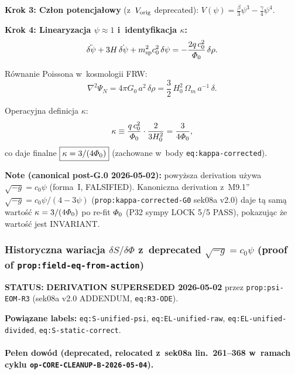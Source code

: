 \textbf{Krok 3: Cz\l{}on potencja\l{}owy} (z~$V_{\rm orig}$ deprecated):
$V(\psi) = \frac{\beta}{3}\psi^3 - \frac{\gamma}{4}\psi^4$.

\textbf{Krok 4: Linearyzacja $\psi \approx 1$ i~identyfikacja $\kappa$:}
\begin{equation}\label{eq:cosmo-linearized-unified}
  \ddot{\delta\psi} + 3H\,\dot{\delta\psi}
  + m_{\mathrm{sp}}^2 c_0^2\,\delta\psi
  = -\frac{2q\,c_0^2}{\varPhi_0}\,\delta\rho.
\end{equation}

R\'ownanie Poissona w~kosmologii FRW:
\begin{equation}\label{eq:poisson-frw}
  \nabla^2\Psi_N = 4\pi G_0\,a^2\,\delta\rho
  = \frac{3}{2}\,H_0^2\,\Omega_m\,a^{-1}\,\delta.
\end{equation}

Operacyjna definicja $\kappa$:
\begin{equation}\label{eq:kappa-def-operational}
  \kappa \equiv \frac{q\,c_0^2}{\varPhi_0}
  \cdot\frac{2}{3H_0^2}
  = \frac{3}{4\varPhi_0},
\end{equation}
co daje finalne $\boxed{\kappa = 3/(4\varPhi_0)}$
(zachowane w~body \texttt{eq:kappa-corrected}).

\textbf{Note (canonical post-G.0 2026-05-02):} powy\.zsza derivation
u\.zywa $\sqrt{-g} = c_0\psi$ (forma~I, FALSIFIED). Kanoniczna derivation
z~M9.1'' $\sqrt{-g} = c_0\psi/(4-3\psi)$ (\texttt{prop:kappa-corrected-G0}
sek08a v2.0) daje t\k{a} sam\k{a} warto\'s\'c $\kappa = 3/(4\varPhi_0)$
po re-fit $\varPhi_0$ (P32 sympy LOCK 5/5 PASS), pokazuj\k{a}c \.ze
warto\'s\'c jest INVARIANT.

\subsubsection{Historyczna wariacja $\delta S/\delta\Phi$ z~deprecated
$\sqrt{-g}=c_0\psi$ (proof of \texttt{prop:field-eq-from-action})}%
\label{app:field-eq-deprecated-proof}

\textbf{STATUS:} \textbf{DERIVATION SUPERSEDED 2026-05-02} przez
\texttt{prop:psi-EOM-R3} (sek08a v2.0 ADDENDUM, \texttt{eq:R3-ODE}).

\textbf{Powiązane labels:} \texttt{eq:S-unified-psi},
\texttt{eq:EL-unified-raw}, \texttt{eq:EL-unified-divided},
\texttt{eq:S-static-correct}.

\paragraph{Pe\l{}en dow\'od (deprecated, relocated z~sek08a lin.~261--368
w~ramach cyklu \texttt{op-CORE-CLEANUP-B-2026-05-04}).}

